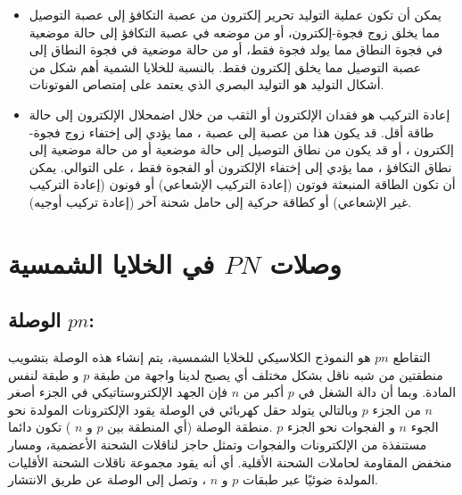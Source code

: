 \begin{itemize}
	\begin{itemize}
		\item 
		يمكن أن تكون عملية التوليد تحرير إلكترون من عصبة التكافؤ إلى عصبة التوصيل مما يخلق زوج فجوة-إلكترون، أو من موضعه في عصبة التكافؤ إلى حالة موضعية في فجوة النطاق مما يولد فجوة فقط، أو من حالة موضعية في فجوة النطاق إلى عصبة التوصيل مما يخلق إلكترون فقط. بالنسبة للخلايا الشمية أهم شكل من أشكال التوليد هو التوليد البصري الذي يعتمد على إمتصاص الفوتونات.
		\item إعادة التركيب هو فقدان الإلكترون أو الثقب من خلال اضمحلال الإلكترون إلى حالة طاقة أقل. قد يكون هذا من عصبة إلى عصبة ، مما يؤدي إلى إختفاء زوج فجوة-إلكترون ، أو قد يكون من نطاق التوصيل إلى حالة موضعية أو من حالة موضعية إلى نطاق التكافؤ ، مما يؤدي إلى إختفاء الإلكترون أو الفجوة فقط ، على التوالي. يمكن أن تكون الطاقة المنبعثة فوتون (إعادة التركيب الإشعاعي) أو فونون (إعادة التركيب غير الإشعاعي) أو كطاقة حركية إلى حامل شحنة آخر (إعادة تركيب أوجيه).
		
		
	\end{itemize}
	
	\section{وصلات $ PN $ في الخلايا الشمسية}
	\subsection{الوصلة $ pn $:} 
	التقاطع $ pn $ هو النموذج الكلاسيكي للخلايا الشمسية، يتم إنشاء هذه الوصلة بتشويب منطقتين من شبه ناقل بشكل مختلف أي يصبح لدينا واجهة من طبقة $ p $ و طبقة لنفس المادة. وبما أن دالة الشغل في $ p $ أكبر من $ n $ فإن الجهد الإلكتروستاتيكي في الجزء أصغر $ n $ من الجزء $ p $ وبالتالي يتولد حقل كهربائي في الوصلة يقود الإلكترونات المولدة نحو الجوء $ n $ و الفجوات نحو الجزء $ p $ .منطقة الوصلة (أي المنطقة بين $ p $ و $ n $ ) تكون دائما مستنفذة من الإلكترونات والفجوات وتمثل حاجز لناقلات الشحنة الأعضمية، ومسار منخفض المقاومة لحاملات الشحنة الأقلية. أي أنه يقود مجموعة ناقلات الشحنة الأقليات المولدة ضوئيًا عبر طبقات $ p $ و $ n $ ، وتصل إلى الوصلة عن طريق الانتشار.

\end{itemize}
